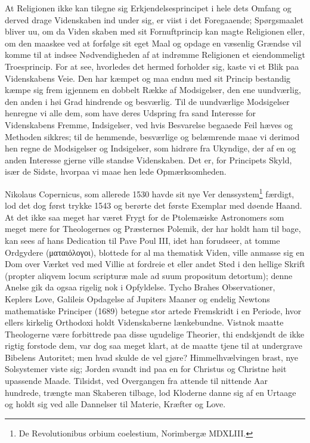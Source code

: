 \documentclass[12pt,a4paper]{article}
\newcommand{\opage}[1]{\marginnote{\footnotesize\textit{[#1]}}}
\begin{document}
At Religionen ikke kan tilegne sig Erkjendelsesprincipet i
hele dets Omfang og derved drage Videnskaben ind under sig, er
\opage{34}viist i det Foregaaende; Spørgsmaalet bliver uu, om da Viden\-%
skaben med sit Fornuftprincip kan magte Religionen eller, om den
maaskee ved at forfølge sit eget Maal og opdage en væsenlig
Grændse vil komme til at indsee Nødvendigheden af at indrømme
Religionen et eiendommeligt Troesprincip. For at see, hvorledes
det hermed forholder sig, kaste vi et Blik paa Videnskabens Veie.
Den har kæmpet og maa endnu med sit Princip bestandig kæmpe
sig frem igjennem en dobbelt Række af Modsigelser, den ene
uundværlig, den anden i høi Grad hindrende og besværlig. Til
de uundværlige Modsigelser henregne vi alle dem, som have deres
Udspring fra sand Interesse for Videnskabens Fremme, Indsigelser,
ved hvis Besvarelse begaaede Feil hæves og Methoden sikkres;
til de hemmende, besværlige og belæmrende maae vi derimod hen\-%
regne de Modsigelser og Indsigelser, som hidrøre fra Ukyndige,
der af en og anden Interesse gjerne ville standse Videnskaben.
Det er, for Principets Skyld, især de Sidste, hvorpaa vi maae hen\-%
lede Opmærksomheden.

Nikolaus Copernicus, som allerede 1530 havde sit nye Ver\-%
denssystem\footnote{De Revolutionibus orbium coelestium, Norimbergæ MDXLIII.} %
færdigt, lod det dog først trykke 1543 og berørte
det første Exemplar med døende Haand. At det ikke saa meget
har været Frygt for de Ptolemæiske Astronomers som meget mere
for Theologernes og Præsternes Polemik, der har holdt ham til\-%
bage, kan sees af hans Dedication til Pave Poul III, idet han
forudseer, at tomme Ordgydere (ματαιόλογοι), blottede for al ma\-%
thematisk Viden, ville anmasse sig en Dom over Værket ved med
Villie at fordreie et eller andet Sted i den hellige Skrift (propter
aliqvem locum scripturæ male ad suum propositum detortum);
denne Anelse gik da ogsaa rigelig nok i Opfyldelse. Tycho Brahes
Observationer, Keplers Love, Galileis Opdagelse af Jupiters Maaner
og endelig Newtons mathematiske Principer (1689) betegne stor\-%
artede Fremskridt i en Periode, hvor ellers kirkelig Orthodoxi
holdt Videnskaberne lænkebundne. Vistnok maatte Theologerne
være forbittrede paa disse ugudelige Theorier, thi endskjøndt de
\opage{35}ikke rigtig forstode dem, var dog saa meget klart, at de maatte
tjene til at undergrave Bibelens Autoritet; men hvad skulde de
vel gjøre? Himmelhvælvingen brast, nye Solsystemer viste sig;
Jorden svandt ind paa en for Christus og Christne høit upassende
Maade. Tilsidst, ved Overgangen fra attende til nittende Aar\-%
hundrede, trængte man Skaberen tilbage, lod Kloderne danne sig
af en Urtaage og holdt sig ved alle Dannelser til Materie, Kræfter
og Love.
\end{document}

